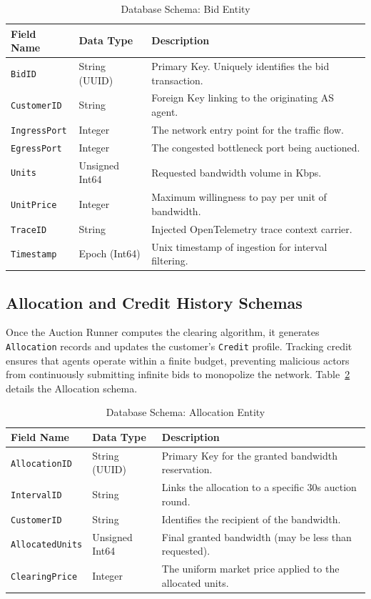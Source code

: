 \begin{table}[H]
\centering
\caption{Database Schema: Bid Entity}
\label{tab:schema_bid}
\begin{tabular}{llp{8cm}}
\toprule
\textbf{Field Name} & \textbf{Data Type} & \textbf{Description} \\
\midrule
\texttt{BidID} & String (UUID) & Primary Key. Uniquely identifies the bid transaction. \\
\texttt{CustomerID} & String & Foreign Key linking to the originating AS agent. \\
\texttt{IngressPort} & Integer & The network entry point for the traffic flow. \\
\texttt{EgressPort} & Integer & The congested bottleneck port being auctioned. \\
\texttt{Units} & Unsigned Int64 & Requested bandwidth volume in Kbps. \\
\texttt{UnitPrice} & Integer & Maximum willingness to pay per unit of bandwidth. \\
\texttt{TraceID} & String & Injected OpenTelemetry trace context carrier. \\
\texttt{Timestamp} & Epoch (Int64) & Unix timestamp of ingestion for interval filtering. \\
\bottomrule
\end{tabular}
\end{table}

\subsection{Allocation and Credit History Schemas}
Once the Auction Runner computes the clearing algorithm, it generates \texttt{Allocation} records and updates the customer's \texttt{Credit} profile. Tracking credit ensures that agents operate within a finite budget, preventing malicious actors from continuously submitting infinite bids to monopolize the network. Table~\ref{tab:schema_allocation} details the Allocation schema.

\begin{table}[H]
\centering
\caption{Database Schema: Allocation Entity}
\label{tab:schema_allocation}
\begin{tabular}{llp{8cm}}
\toprule
\textbf{Field Name} & \textbf{Data Type} & \textbf{Description} \\
\midrule
\texttt{AllocationID} & String (UUID) & Primary Key for the granted bandwidth reservation. \\
\texttt{IntervalID} & String & Links the allocation to a specific 30s auction round. \\
\texttt{CustomerID} & String & Identifies the recipient of the bandwidth. \\
\texttt{AllocatedUnits} & Unsigned Int64 & Final granted bandwidth (may be less than requested). \\
\texttt{ClearingPrice} & Integer & The uniform market price applied to the allocated units. \\
\bottomrule
\end{tabular}
\end{table}

